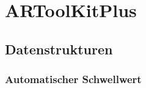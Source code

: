 \section{ARToolKitPlus} %
\label{sec:artoolkitplus}



\subsection{Datenstrukturen} %
\label{sec:datenstrukturen}


\subsubsection{Automatischer Schwellwert} %
\label{sec:automatischer_schwellwert}

